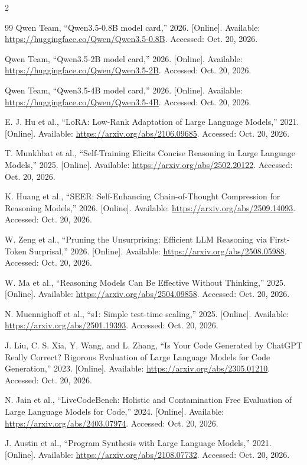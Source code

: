 \documentclass[11pt,letterpaper]{article}
\begin{document}
\begin{multicols}{2}
\begin{thebibliography}{99}
 Qwen Team, ``Qwen3.5-0.8B model card,'' 2026. [Online]. Available: \url{https://huggingface.co/Qwen/Qwen3.5-0.8B}. Accessed: Oct. 20, 2026.

 Qwen Team, ``Qwen3.5-2B model card,'' 2026. [Online]. Available: \url{https://huggingface.co/Qwen/Qwen3.5-2B}. Accessed: Oct. 20, 2026.

 Qwen Team, ``Qwen3.5-4B model card,'' 2026. [Online]. Available: \url{https://huggingface.co/Qwen/Qwen3.5-4B}. Accessed: Oct. 20, 2026.

 E. J. Hu et al., ``LoRA: Low-Rank Adaptation of Large Language Models,'' 2021. [Online]. Available: \url{https://arxiv.org/abs/2106.09685}. Accessed: Oct. 20, 2026.

 T. Munkhbat et al., ``Self-Training Elicits Concise Reasoning in Large Language Models,'' 2025. [Online]. Available: \url{https://arxiv.org/abs/2502.20122}. Accessed: Oct. 20, 2026.

 K. Huang et al., ``SEER: Self-Enhancing Chain-of-Thought Compression for Reasoning Models,'' 2026. [Online]. Available: \url{https://arxiv.org/abs/2509.14093}. Accessed: Oct. 20, 2026.

 W. Zeng et al., ``Pruning the Unsurprising: Efficient LLM Reasoning via First-Token Surprisal,'' 2026. [Online]. Available: \url{https://arxiv.org/abs/2508.05988}. Accessed: Oct. 20, 2026.

 W. Ma et al., ``Reasoning Models Can Be Effective Without Thinking,'' 2025. [Online]. Available: \url{https://arxiv.org/abs/2504.09858}. Accessed: Oct. 20, 2026.

 N. Muennighoff et al., ``s1: Simple test-time scaling,'' 2025. [Online]. Available: \url{https://arxiv.org/abs/2501.19393}. Accessed: Oct. 20, 2026.

 J. Liu, C. S. Xia, Y. Wang, and L. Zhang, ``Is Your Code Generated by ChatGPT Really Correct? Rigorous Evaluation of Large Language Models for Code Generation,'' 2023. [Online]. Available: \url{https://arxiv.org/abs/2305.01210}. Accessed: Oct. 20, 2026.

 N. Jain et al., ``LiveCodeBench: Holistic and Contamination Free Evaluation of Large Language Models for Code,'' 2024. [Online]. Available: \url{https://arxiv.org/abs/2403.07974}. Accessed: Oct. 20, 2026.

 J. Austin et al., ``Program Synthesis with Large Language Models,'' 2021. [Online]. Available: \url{https://arxiv.org/abs/2108.07732}. Accessed: Oct. 20, 2026.

\end{thebibliography}

\end{multicols}
\end{document}
